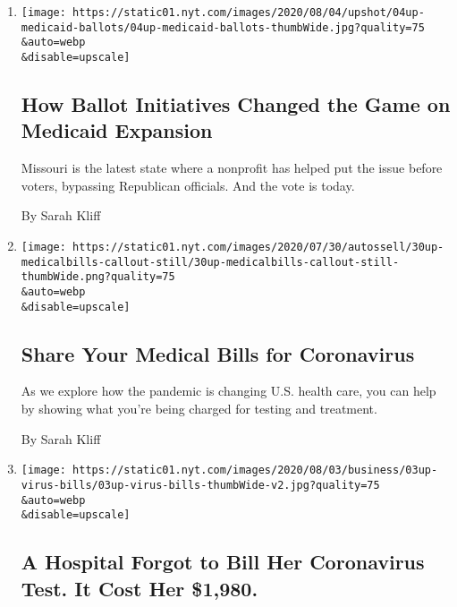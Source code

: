 \begin{enumerate}
\def\labelenumi{\arabic{enumi}.}
\item
  \href{/2020/08/04/upshot/missouri-election-medicaid-expansion.html}{}

  \texttt{[image: https://static01.nyt.com/images/2020/08/04/upshot/04up-medicaid-ballots/04up-medicaid-ballots-thumbWide.jpg?quality=75\\\&auto=webp\\\&disable=upscale]}

  \hypertarget{how-ballot-initiatives-changed-the-game-on-medicaid-expansion}{%
  \subsection{How Ballot Initiatives Changed the Game on Medicaid
  Expansion}\label{how-ballot-initiatives-changed-the-game-on-medicaid-expansion}}

  Missouri is the latest state where a nonprofit has helped put the
  issue before voters, bypassing Republican officials. And the vote is
  today.

  By Sarah Kliff
\item
  \href{/2020/08/03/reader-center/coronavirus-medical-bills.html}{}

  \texttt{[image: https://static01.nyt.com/images/2020/07/30/autossell/30up-medicalbills-callout-still/30up-medicalbills-callout-still-thumbWide.png?quality=75\\\&auto=webp\\\&disable=upscale]}

  \hypertarget{share-your-medical-bills-for-coronavirus}{%
  \subsection{Share Your Medical Bills for
  Coronavirus}\label{share-your-medical-bills-for-coronavirus}}

  As we explore how the pandemic is changing U.S. health care, you can
  help by showing what you're being charged for testing and treatment.

  By Sarah Kliff
\item
  \href{/2020/08/03/upshot/nj-coronavirus-medical-bill.html}{}

  \texttt{[image: https://static01.nyt.com/images/2020/08/03/business/03up-virus-bills/03up-virus-bills-thumbWide-v2.jpg?quality=75\\\&auto=webp\\\&disable=upscale]}

  \hypertarget{a-hospital-forgot-to-bill-her-coronavirus-test-it-cost-her-1980}{%
  \subsection{A Hospital Forgot to Bill Her Coronavirus Test. It Cost
  Her
  \$1,980.}\label{a-hospital-forgot-to-bill-her-coronavirus-test-it-cost-her-1980}}


\end{enumerate}
